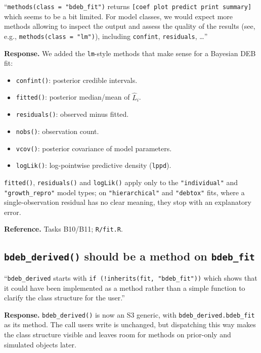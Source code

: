 \documentclass[11pt,a4paper]{article}
\newcommand{\code}[1]{\texttt{#1}}
\begin{document}
\begin{displayquote}
``\verb|methods(class = "bdeb_fit")| returns
\verb|[coef plot predict print summary]| which seems to be a bit
limited. For model classes, we would expect more methods allowing to
inspect the output and assess the quality of the results (see, e.g.,
\verb|methods(class = "lm")|), including \code{confint},
\code{residuals}, \ldots''
\end{displayquote}

\textbf{Response.} We added the \code{lm}-style methods that make sense
for a Bayesian DEB fit:

\begin{itemize}[nosep]
\item \code{confint()}: posterior credible intervals.
\item \code{fitted()}: posterior median/mean of $\hat{L}_i$.
\item \code{residuals()}: observed minus fitted.
\item \code{nobs()}: observation count.
\item \code{vcov()}: posterior covariance of model parameters.
\item \code{logLik()}: log-pointwise predictive density
  (\code{lppd}).
\end{itemize}

\code{fitted()}, \code{residuals()} and \code{logLik()} apply only to the
\verb|"individual"| and \verb|"growth_repro"| model types; on
\verb|"hierarchical"| and \verb|"debtox"| fits, where a
single-observation residual has no clear meaning, they stop with an
explanatory error.

\textbf{Reference.} Tasks B10/B11; \code{R/fit.R}.

\subsection{\code{bdeb\_derived()} should be a method on
\code{bdeb\_fit}}

\begin{displayquote}
``\code{bdeb\_derived} starts with
\verb|if (!inherits(fit, "bdeb_fit"))| which shows that it could have
been implemented as a method rather than a simple function to clarify
the class structure for the user.''
\end{displayquote}

\textbf{Response.} \code{bdeb\_derived()} is now an S3 generic, with
\code{bdeb\_derived.bdeb\_fit} as its method. The call users write is
unchanged, but dispatching this way makes the class structure visible and
leaves room for methods on prior-only and simulated objects later.
\end{document}

